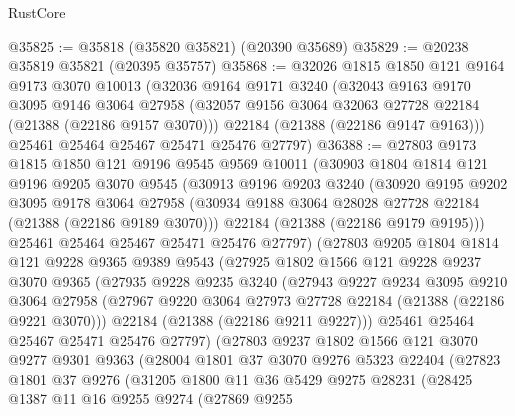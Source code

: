 \begin{lexlean}{RustCore}
\begin{coremodule}
@35825 := @35818 (@35820 @35821) (@20390 @35689)
@35829 := @20238 @35819 @35821 (@20395 @35757)
@35868 := @32026
    @1815
    @1850
    @121
    @9164
    @9173
    @3070
    @10013
    (@32036
      @9164
      @9171
      @3240
      (@32043
        @9163
        @9170
        @3095
        @9146
        @3064
        @27958
        (@32057 @9156 @3064 @32063 @27728 @22184 (@21388 (@22186 @9157 @3070)))
        @22184
        (@21388 (@22186 @9147 @9163)))
      @25461
      @25464
      @25467
      @25471
      @25476
      @27797)
@36388 := @27803
    @9173
    @1815
    @1850
    @121
    @9196
    @9545
    @9569
    @10011
    (@30903
      @1804
      @1814
      @121
      @9196
      @9205
      @3070
      @9545
      (@30913
        @9196
        @9203
        @3240
        (@30920
          @9195
          @9202
          @3095
          @9178
          @3064
          @27958
          (@30934 @9188 @3064 @28028 @27728 @22184 (@21388 (@22186 @9189 @3070)))
          @22184
          (@21388 (@22186 @9179 @9195)))
        @25461
        @25464
        @25467
        @25471
        @25476
        @27797)
      (@27803
        @9205
        @1804
        @1814
        @121
        @9228
        @9365
        @9389
        @9543
        (@27925
          @1802
          @1566
          @121
          @9228
          @9237
          @3070
          @9365
          (@27935
            @9228
            @9235
            @3240
            (@27943
              @9227
              @9234
              @3095
              @9210
              @3064
              @27958
              (@27967 @9220 @3064 @27973 @27728 @22184 (@21388 (@22186 @9221 @3070)))
              @22184
              (@21388 (@22186 @9211 @9227)))
            @25461
            @25464
            @25467
            @25471
            @25476
            @27797)
          (@27803
            @9237
            @1802
            @1566
            @121
            @3070
            @9277
            @9301
            @9363
            (@28004
              @1801
              @37
              @3070
              @9276
              @5323
              @22404
              (@27823
                @1801
                @37
                @9276
                (@31205
                  @1800
                  @11
                  @36
                  @5429
                  @9275
                  @28231
                  (@28425
                    @1387
                    @11
                    @16
                    @9255
                    @9274
                    (@27869
                      @9255

\end{coremodule}
\end{lexlean}
